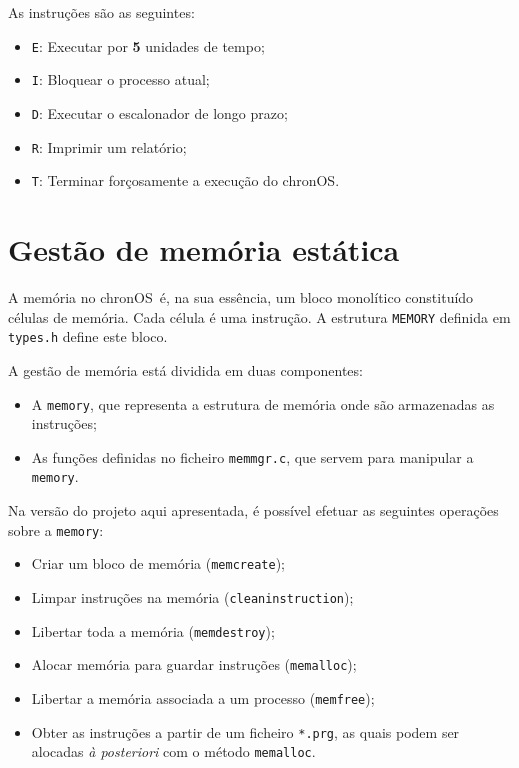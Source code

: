 \documentclass[10pt,oneside]{estiloUBI}
\newcommand{\chronOS}{\textsf{chronOS}}
\begin{document}
	As instruções são as seguintes:
	
	\begin{itemize}
		\item \verb|E|: Executar por \textbf{5} unidades de tempo;
		\item \verb|I|: Bloquear o processo atual;
		\item \verb|D|: Executar o escalonador de longo prazo;
		\item \verb|R|: Imprimir um relatório;
		\item \verb|T|: Terminar forçosamente a execução do \chronOS.
	\end{itemize}
	
	
	\chapter{Gestão de memória estática}
	\label{sec:memory}
	
	A memória no \chronOS~é, na sua essência, um bloco monolítico constituído células de memória. Cada célula é uma instrução. A estrutura \verb|MEMORY| definida em \texttt{types.h} define este bloco.
	
	A gestão de memória está dividida em duas componentes:
	\begin{itemize}
		\item A \verb|memory|, que representa a estrutura de memória onde são armazenadas as instruções;
		\item As funções definidas no ficheiro \verb|memmgr.c|, que servem para manipular a \verb|memory|.
	\end{itemize}
	
	Na versão do projeto aqui apresentada, é possível efetuar as seguintes operações sobre a \verb|memory|:
	\begin{itemize}
		\item Criar um bloco de memória (\verb|memcreate|);
		\item Limpar instruções na memória (\verb|cleaninstruction|);
		\item Libertar toda a memória (\verb|memdestroy|);
		\item Alocar memória para guardar instruções (\verb|memalloc|);
		\item Libertar a memória associada a um processo (\verb|memfree|);
		\item Obter as instruções a partir de um ficheiro \verb|*.prg|, as quais podem ser alocadas \textit{à posteriori} com o método \verb|memalloc|.
	\end{itemize}
	
\end{document}
